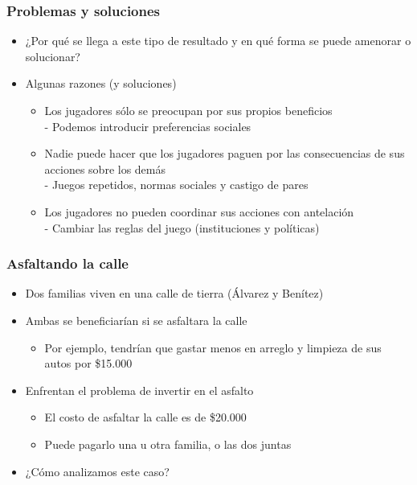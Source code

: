 \documentclass{beamer}
\begin{document}
\begin{frame}
\frametitle{Problemas y soluciones}
\begin{itemize}
    \item ¿Por qué se llega a este tipo de resultado y en qué forma se puede amenorar o solucionar?
    \item Algunas razones (y soluciones)
        \begin{itemize}
        \item Los jugadores sólo se preocupan por sus propios beneficios \\
        - Podemos introducir preferencias sociales
        \item Nadie puede hacer que los jugadores paguen por las consecuencias de sus acciones sobre los demás \\
        - Juegos repetidos, normas sociales y castigo de pares
        \item Los jugadores no pueden coordinar sus acciones con antelación \\
        - Cambiar las reglas del juego (instituciones y políticas)
        \end{itemize}
\end{itemize}
\end{frame}

\begin{frame}
\frametitle{Asfaltando la calle}
\begin{itemize}
    \item Dos familias viven en una calle de tierra (Álvarez y Benítez)
    \item Ambas se beneficiarían si se asfaltara la calle
        \begin{itemize}
        \item Por ejemplo, tendrían que gastar menos en arreglo y limpieza de sus autos por \$15.000
        \end{itemize}
    \item Enfrentan el problema de invertir en el asfalto
        \begin{itemize}
        \item El costo de asfaltar la calle es de \$20.000
        \item Puede pagarlo una u otra familia, o las dos juntas
        \end{itemize}
\item ¿Cómo analizamos este caso?
\end{itemize}
\end{frame}
\end{document}
